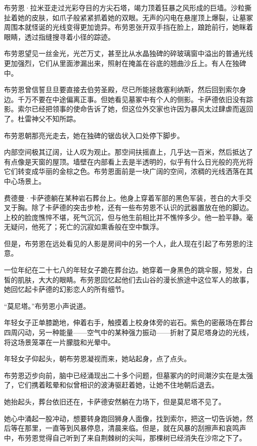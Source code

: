 \documentclass[AutoFakeBold=true]{book}
\begin{document}
\vspace*{1em}

布劳恩·拉米亚走过光彩夺目的方尖石塔，竭力顶着狂暴之风形成的巨墙。沙粒撕扯着她的皮肤，如爪子般紧紧抓着她的双眼。无声的闪电在悬崖顶上爆裂，让墓冢周围本就怪诞的光线变得更加诡异。布劳恩张开双手挡在脸上，踉跄前行，她眯着眼睛，透过指缝搜寻着小径的踪迹。

布劳恩望见一丝金光，光芒万丈，甚至比从水晶独碑的碎玻璃窗中溢出的普通光线更加强烈，它们从里面渗漏出来，照射在掩盖在谷底的翘曲沙丘上。有人在独碑中。

布劳恩曾信誓旦旦要直接去伯劳圣殿，尽已所能拯救塞利纳斯，然后回到索尔身边。千万不要在中途偏离正事。但她看见墓冢中有个人的侧影。卡萨德依旧没有踪影。索尔已经把领事的使命告诉了她，但这位外交家也许因为暴风太过肆虐而返回了。杜雷神父不知所踪。

布劳恩朝那亮光走去，她在独碑的锯齿状入口处停下脚步。

内部空间极其辽阔，让人叹为观止。那空间扶摇直上，几乎达一百米，然后抵达了有点像是天窗的屋顶。墙壁在内部看上去是半透明的，似乎有什么日光般的亮光将它们转变成华丽的金棕之色。布劳恩面前是一块广阔的空间，浓稠的光线洒落在其中心场景上。

费德曼·卡萨德躺在某种岩石葬台上。他身上穿着军部的黑色军装，苍白的大手交叉于胸。除了卡萨德的突击步枪，还有一些布劳恩不认识的武器置放在他的脚边。上校的脸庞憔悴不堪，死气沉沉，但与他生前相比并不憔悴多少。他一脸平静。毫无疑问，他死了；死亡的沉寂如熏香般在空中飘浮。

但是，布劳恩在远处看见的人影是房间中的另一个人，此人现在引起了布劳恩的注意。

一位年纪在二十七八的年轻女子跪在葬台边。她穿着一身黑色的跳伞服，短发，白皙的肌肤，大大的眼睛。布劳恩回忆起他们去山谷的漫长旅途中这位军人的故事，她回忆起卡萨德的幻影恋人的所有细节。

``莫尼塔。''布劳恩小声说道。

年轻女子正单膝跪地，伸着右手，触摸着上校身体旁的岩石。紫色的密蔽场在葬台四周闪动，另一种能量——空气中的某种强力振动——折射了莫尼塔身边的光线，将这场景笼罩在一片朦胧和光晕中。

年轻女子仰起头，朝布劳恩凝视而来，她站起身，点了点头。

布劳恩迈步向前，脑中已经涌现出二十多个问题，但墓冢内的时间潮汐实在是太强了，它们携着眩晕和似曾相识的波涛驱赶着她，让她不住地朝后退去。

她抬起头，葬台依旧还在，卡萨德安然躺在力场下，但是莫尼塔不见了。

她心中涌起一股冲动，想要转身跑回狮身人面像，找到索尔，把这一切告诉她，然后等在那里，一直等到风暴停息，清晨来临。但是，就在风暴的刮擦声和哀鸣声中，布劳恩觉得自己听到了来自荆棘树的尖叫，那棵树已经消失在沙帘之下了。
\end{document}
